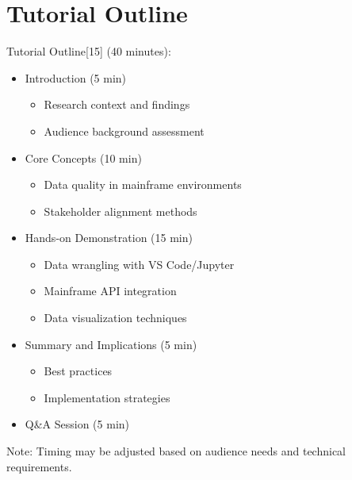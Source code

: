 \documentclass[a4paper]{article}
\begin{document}
\section{Tutorial Outline}
Tutorial Outline[15] (40 minutes):
\begin{itemize}
    \item Introduction (5 min)
    \begin{itemize}
        \item Research context and findings
        \item Audience background assessment
    \end{itemize}
    \item Core Concepts (10 min)
    \begin{itemize}
        \item Data quality in mainframe environments
        \item Stakeholder alignment methods
    \end{itemize}
    \item Hands-on Demonstration (15 min)
    \begin{itemize}
        \item Data wrangling with VS Code/Jupyter
        \item Mainframe API integration
        \item Data visualization techniques
    \end{itemize}
    \item Summary and Implications (5 min)
        \begin{itemize}
            \item Best practices
            \item Implementation strategies
        \end{itemize}
    \item Q\&A Session (5 min)
\end{itemize}

Note: Timing may be adjusted based on audience needs and technical requirements.
\end{document}
